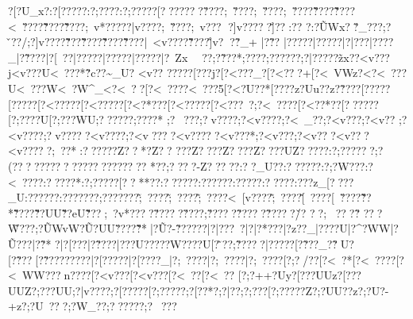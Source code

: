 {{{{{{{{{{{{{{{{{{{{{{{{{{{{{{{{{{{{{{{{{{{{{{{{{{{{{{{{{{{{{{{{{{{{{{{{{{{{{{{{{{{{{{{{{{{{{{{{{{{{{{{{{{{{{{{{{{{{{{{{{{{{{{{{{{{{{{{{{{{{{{{{{{{{{{{{{{{{{{{{{{{{{{{{{{{{{{{{{{{{{{{{{{{{{{{{{{{{{{{{{{{{{{{{{{{{{{{{{{{{{{{{{{{{{{{{{{{{{{{{{{{{{{{{{{{{{{{{{{{{{{{{{{{{{{{{{{{{{{{{{{{{{{{{{{{{{{{{{{{{{{{{{{{{{{{{{{{{{{{{{{{{{{{{{{{{{{{{{{{{{{{{{{{{{{{{{{{{{{{{{{{{{{{{{{{{{{{{{{{{{{{{{{{{{{{{{{{{{{{{{{{{{{{{{{{{{{{{{{{{{{{{{{{{{{{{{{{{{{{{{{{{{{{{{{{{{{{{{{{{{{{{{{{{{{{{{{{{{{{{{{{{{{{{{{{{{{{{{{{{{{{{{{{{{{{{{{{{{{{{{{{{{{{{{{{{{{{{{{{{{{{{{{{{{{{{{{{{{{{{{{{{{{{{{{{{{{{{{{{{{{{{{{{{{{{{{{{{{{{{{{{{{{{{{{{{{{{{{{{{{{{{{{{{{{{{{{{{{{{{{{{{{{{{{{{{{{{{{{{{{{{{{{{{{{{{{{{{{{{{{{{{{{{{{{{{{{{{{{{{{{{{{{{{{{{{{{{{{{{{{{{{{{{{{{{{{{{{{{{{{{{{{{{{{{{{{{{{{{{{{{{{{{{{{{{{{{{{{{{{{{{{{{{{{{{{{{{{{{{{{{{{{{{{{?[?U_x?:?[?????:?;????:?;?????[???????\v????;~\v????;~\v????;~\v????\v\~????\~\v????<~\v????\v\~????\~\v????;~}v*?????|v????;~\v????;~}v???
?]v?????\v]??:?\vU?
?:?\~UWx??\v_???;?\v??/;?]v????\~\v??? \~\v????\~\v????\~\v????|~<v????\v\~????\~]v??\?\~?_+	|?\~??
|?\?????|?\?????|?|???|?\????_|?\~????|?[~??|?\?????|?\?????|?\?????|?\?~Zx~\?~ ?? ;?\~???*;?\???? ;?????? ;?|?????\?\~zx??<v\????j<v\????U\?<~???*\?\~?c??\?\~_U?
\?<v??
 {?\?????\?[???j?[?<???_?[?<???+[?<~VWz?<?<~???U\?<~???W\?<~?W^_<?<~??[?<~????\?<~???5[?<?U??*[?\???? z?\?Uu??z?\~????\?[?????\?[?????[?<?????[?<?????[?<?*???[?<?????[?<???~?;?<~????[?<??*??[??????[?;????U[?;???WU;??????;??}??*
;?~??? ;?v????;?<v????;?<~_{??;?<v??? ;?<v??
 ;?<v????;?v?????<v????;?<v????<v?????<v???*;?<v??? ;?<v??  ?<v??  ?<v?????;~??*:??????Z?? *?Z??
???Z??  ??Z??  ??Z?? ??UZ?? ???:?;??????;? (????????????????? ?????}
*??;????-Z?????:??_U??:??????:?;?W???:?<~????:?????*:?;?????[??**?{?:??????:?????{?:? ???{?:????{?:???z_[????_U:??? ???:???????;???????\~;~????\~;~????\~;~????<~[v????\~;~????\v[~????[~\v????\~\v??*\~\v????\v\~??UU\v\~??eU\~\v???;~?v*????\v?????\v????;?\v ????\~?????\~?????\v/?
??;~ 
???\~?
???\~W???;?\~UWvW}?\~U?UU\?\v????\~\v?* |?\~U?-\~??????|?|???~?|?|?*???|?\?z??_|?\????U|?\?^?WW|?\~U???|?\~?*
?|?[?  ??|?\~????|?\???U?{?\????W{?\????U[?\~??};?\~ ????|?????[?\~???_{?\~?U?[?\~???[?\~????{?\?????|?[?????|?[????_|?;~????|?;~????|?;~????[?;?/??[?<~  ?*[?<~????[?<~WW??{?n????[?<v??? [?<v??? [?<~??[?<~??
 [?;?++?Uy?[???UUz?[???UUZ?;???UU;?|v????;?[?????[?;?????;?[?? *?;?|??   ;?;??}?[?;?????Z?;?UU??z?;?U?-+z?;?U~???;?W_??;??????;?~???
}}}}}}}}}}}}}}}}}}}}}}}}}}}}}}}}}}}}}}}}}}}}}}}}}}}}}}}}}}}}}}}}}}}}}}}}}}}}}}}}}}}}}}}}}}}}}}}}}}}}}}}}}}}}}}}}}}}}}}}}}}}}}}}}}}}}}}}}}}}}}}}}}}}}}}}}}}}}}}}}}}}}}}}}}}}}}}}}}}}}}}}}}}}}}}}}}}}}}}}}}}}}}}}}}}}}}}}}}}}}}}}}}}}}}}}}}}}}}}}}}}}}}}}}}}}}}}}}}}}}}}}}}}}}}}}}}}}}}}}}}}}}}}}}}}}}}}}}}}}}}}}}}}}}}}}}}}}}}}}}}}}}}}}}}}}}}}}}}}}}}}}}}}}}}}}}}}}}}}}}}}}}}}}}}}}}}}}}}}}}}}}}}}}}}}}}}}}}}}}}}}}}}}}}}}}}}}}}}}}}}}}}}}}}}}}}}}}}}}}}}}}}}}}}}}}}}}}}}}}}}}}}}}}}}}}}}}}}}}}}}}}}}}}}}}}}}}}}}}}}}}}}}}}}}}}}}}}}}}}}}}}}}}}}}}}}}}}}}}}}}}}}}}}}}}}}}}}}}}}}}}}}}}}}}}}}}}}}}}}}}}}}}}}}}}}}}}}}}}}}}}}}}}}}}}}}}}}}}}}}}}}}}}}}}}}}}}}}}}}}}}}}}}}}}}}}}}}}}}}}}}}}}}}}}}}}}}}}}}}}}}}}}}}}}}}}}}}}}}}}}}}}}}}}}}}}}}}}}}}}}}}}}}}}}}}}}}}}}}}}}}}}}}}}}}}}}}}}}}}}}}}}}}}}}}}}}}}}}}}}}}}}}}}}}}}}}}}}}}}}}}}}}}}}}}}}}
